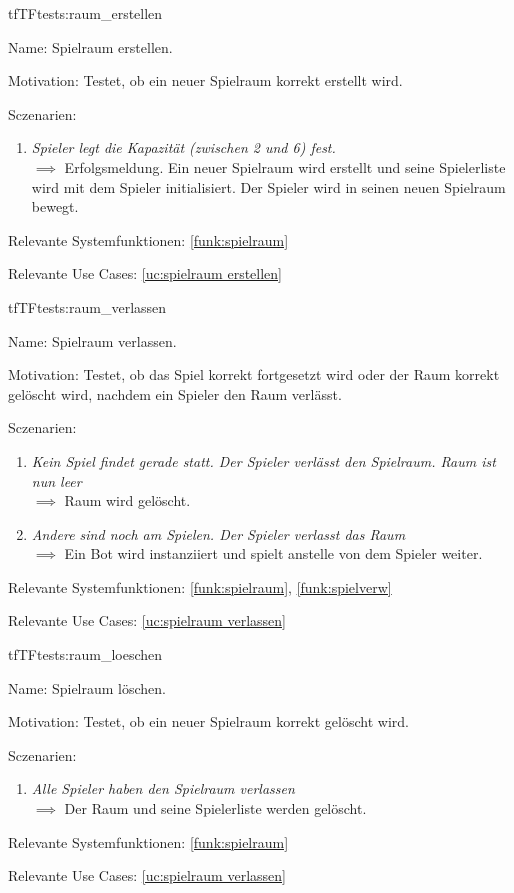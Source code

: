 \begin{description}[leftmargin=5em, style=sameline]
\begin{lhp}{tf}{TF}{tests:raum_erstellen}
	\item [Name:] Spielraum erstellen.
	\item [Motivation:] Testet, ob ein neuer Spielraum korrekt erstellt wird.
	\item [Sczenarien:] \hfill
		\begin{enumerate}
			\item \textit{Spieler legt die Kapazität (zwischen 2 und 6) fest.} \\ $\implies$ Erfolgsmeldung. Ein neuer Spielraum wird erstellt und seine Spielerliste wird mit dem Spieler initialisiert. Der Spieler wird in seinen neuen Spielraum bewegt.  
		\end{enumerate}
	\item [Relevante Systemfunktionen:] \ref{funk:spielraum}
	\item [Relevante Use Cases:] \ref{uc:spielraum erstellen}
\end{lhp}

\begin{lhp}{tf}{TF}{tests:raum_verlassen}
	\item [Name:] Spielraum verlassen.
	\item [Motivation:] Testet, ob das Spiel korrekt fortgesetzt wird oder der Raum korrekt gelöscht wird, nachdem ein Spieler den Raum verlässt. 
	\item [Sczenarien:] \hfill
		\begin{enumerate}
			\item \textit{Kein Spiel findet gerade statt. Der Spieler verlässt den Spielraum. Raum ist nun leer} \\ $\implies$ Raum wird gelöscht.  
			\item \textit{Andere sind noch am Spielen. Der Spieler verlasst das Raum} \\ $\implies$ Ein Bot wird  instanziiert und spielt anstelle von dem Spieler weiter. 
		\end{enumerate}
	\item [Relevante Systemfunktionen:] \ref{funk:spielraum}, \ref{funk:spielverw}
	\item [Relevante Use Cases:] \ref{uc:spielraum verlassen}
\end{lhp}

\begin{lhp}{tf}{TF}{tests:raum_loeschen}
	\item [Name:] Spielraum löschen.
	\item [Motivation:] Testet, ob ein neuer Spielraum korrekt gelöscht wird.
	\item [Sczenarien:] \hfill
		\begin{enumerate}
			\item \textit{Alle Spieler haben den Spielraum verlassen} \\ $\implies$  Der Raum und seine Spielerliste werden gelöscht.
		\end{enumerate}
	\item [Relevante Systemfunktionen:] \ref{funk:spielraum}
	\item [Relevante Use Cases:] \ref{uc:spielraum verlassen}
\end{lhp}


\end{description}
